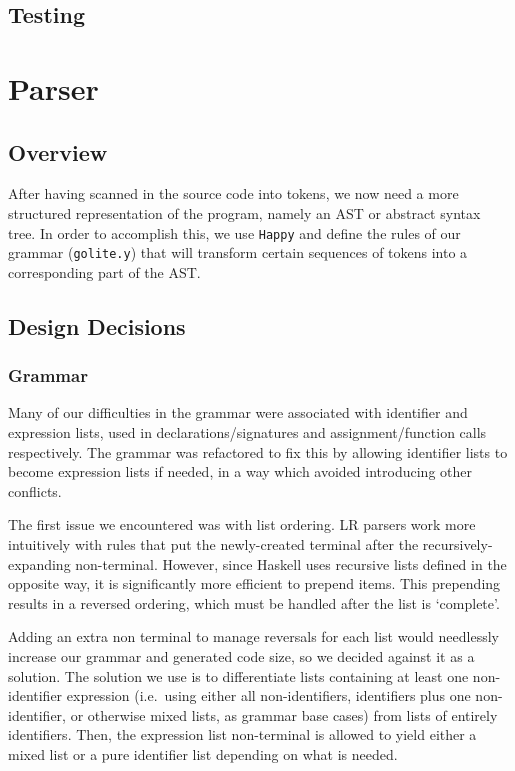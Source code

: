 \documentclass[11pt]{article}
\begin{document}
\subsection{Testing}
\section{Parser}
\subsection{Overview}
After having scanned in the source code into tokens, we now need a
more structured representation of the program, namely an AST or
abstract syntax tree. In order to accomplish this, we use
\texttt{Happy}\cite{github:happy} and define the rules of our grammar
(\texttt{golite.y}) that will transform certain sequences of tokens
into a corresponding part of the AST.
\subsection{Design Decisions}
\subsubsection{Grammar}
Many of our difficulties in the grammar were associated with
identifier and expression lists, used in declarations/signatures and
assignment/function calls respectively. The grammar was refactored to
fix this by allowing identifier lists to become expression lists if
needed, in a way which avoided introducing other conflicts.

The first issue we encountered was with list ordering. LR parsers work
more intuitively with rules that put the newly-created terminal after
the recursively-expanding non-terminal. However, since Haskell uses
recursive lists defined in the opposite way, it is significantly more
efficient to prepend items. This prepending results in a reversed
ordering, which must be handled after the list is `complete'.

Adding an extra non terminal to manage reversals for each list would
needlessly increase our grammar and generated code size, so we decided
against it as a solution. The solution we use is to differentiate
lists containing at least one non-identifier expression (i.e.\ using
either all non-identifiers, identifiers plus one non-identifier, or
otherwise mixed lists, as grammar base cases) from lists of entirely
identifiers. Then, the expression list non-terminal is allowed to
yield either a mixed list or a pure identifier list depending on what
is needed.
\end{document}
